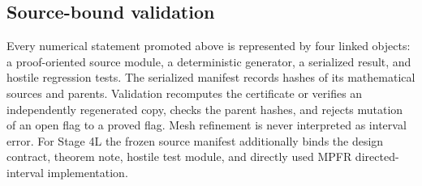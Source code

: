 \subsection{Source-bound validation}

Every numerical statement promoted above is represented by four linked
objects: a proof-oriented source module, a deterministic generator, a
serialized result, and hostile regression tests.  The serialized manifest
records hashes of its mathematical sources and parents.  Validation
recomputes the certificate or verifies an independently regenerated copy,
checks the parent hashes, and rejects mutation of an open flag to a proved
flag.  Mesh refinement is never interpreted as interval error.  For Stage 4L
the frozen source manifest additionally binds the design contract, theorem
note, hostile test module, and directly used MPFR directed-interval
implementation.

